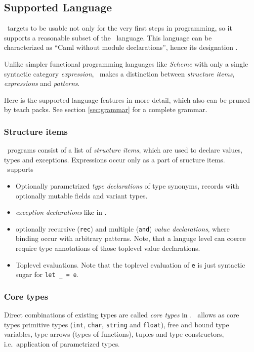 
\subsection{Supported Language}
\label{sec:language}

\easyocaml\ targets to be usable not only for the very first steps in
programming, so it supports a reasonable subset of the \ocaml\ language.
This language can be characterized as ``Caml without module declarations'',
hence its designation \camlm.

Unlike simpler functional programming languages like \textit{Scheme} with only a single
syntactic category \emph{expression}, \ocaml\ makes a distinction between 
\emph{structure items}, \emph{expressions} and \emph{patterns}.

Here is the supported language features in more detail, which also can be
pruned by teach packs. See section \ref{sec:grammar} for a complete grammar.


\subsubsection*{Structure items}

\ocaml\ programs consist of a list of \emph{structure items}, which are used to
declare values, types and exceptions. Expressions occur only as a part of
sructure items. \easyocaml\ supports
\begin{itemize}
  \item Optionally parametrized \emph{type declarations} of type synonyms,
    records with optionally mutable fields and variant types.
  \item \emph{exception declarations} like in \ocaml.
  \item optionally recursive (\texttt{rec}) and multiple (\texttt{and})
    \emph{value declarations}, where binding occur with arbitrary patterns.
    Note, that a languge level can coerce require type annotations of those
    toplevel value declarations.
  \item Toplevel evaluations. Note that the toplevel evaluation of \texttt{e} is just
    syntactic sugar for \texttt{let \_ = e}.
\end{itemize}

\subsubsection*{Core types}
Direct combinations of existing types are called \emph{core types} in \ocaml.
\easyocaml\ allows as core types primitive types (\texttt{int}, \texttt{char},
\texttt{string} and \texttt{float}), free and bound type variables, type arrows
(types of functions), tuples and type constructors, i.e.\ application of
parametrized types.


